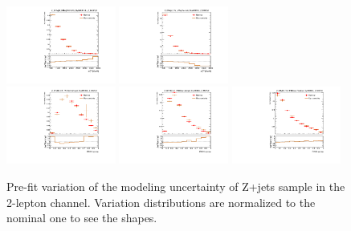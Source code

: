 \begin{figure}[htbp]
\begin{center}
 \includegraphics[width=0.32\textwidth,keepaspectratio]{figures/syst/Z_0ptag1pfat0pjet_0ptv_CRVjet_MTagMerJets_SysMODEL_Z_MGPy8_Norm.pdf}
 \includegraphics[width=0.32\textwidth,keepaspectratio]{figures/syst/Z_0ptag2pjet_0ptv_CRVjet_Fid_MTagResJets_SysMODEL_Z_MGPy8_Norm.pdf}
 \\
 \includegraphics[width=0.32\textwidth,keepaspectratio]{figures/syst/Z_0ptag1pfat0pjet_0ptv_SRVBS_HP_RNNScoreMerged_SysMODEL_Z_MGPy8_Norm.pdf}
 \includegraphics[width=0.32\textwidth,keepaspectratio]{figures/syst/Z_0ptag1pfat0pjet_0ptv_SRVBS_LP_RNNScoreMerged_SysMODEL_Z_MGPy8_Norm.pdf}
 \includegraphics[width=0.32\textwidth,keepaspectratio]{figures/syst/Z_0ptag2pjet_0ptv_SRVBS_Fid_RNNScoreResolved_SysMODEL_Z_MGPy8_Norm.pdf}
 \caption[f]{
Pre-fit variation of the modeling uncertainty of Z+jets sample in the 2-lepton channel.  Variation distributions are normalized to the nominal one to see the shapes.
}
\label{fig:modelingZ}
\end{center}
\end{figure}

